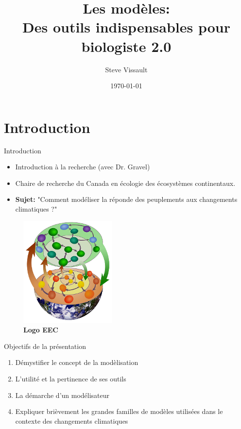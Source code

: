 \documentclass{eecslides}
\title[Les modèles]{\textbf{Les modèles:\\}Des outils indispensables pour biologiste 2.0}
\author[SV]{Steve Vissault}
\institute[Chaire de recherche EEC]{\textbf{Chaire de recherche en écologie des écosystèmes continentaux}}
\date{\today}
\begin{document}
	\begin{frame}[plain]
		\titlepage
	\end{frame}


	\section{Introduction}
	\begin{frame}{Introduction}
	    		  
		    \begin{itemize}
			\item Introduction à la recherche (avec Dr. Gravel)
			\item Chaire de recherche du Canada en écologie des écosystèmes continentaux.
			\item \textbf{Sujet:} "Comment modéliser la réponde des peuplements aux changements climatiques ?"
		    \end{itemize}
		    
		\begin{figure}
			\includegraphics[width=0.2\linewidth]{logoCREEC.png}
			\caption*{\scriptsize \alert{\textbf{Logo EEC}}} 
		\end{figure}

	\end{frame}
	\begin{frame}{Objectifs de la présentation}
	    		  
		    \begin{enumerate}
			\item Démystifier le concept de la modèlisation
			\item L'utilité et la pertinence de ses outils 
			\item La démarche d'un modélisateur
			\item Expliquer brièvement les grandes familles de modèles utilisées dans le contexte des changements climatiques
		    \end{enumerate}
	\end{frame}
\end{document}
